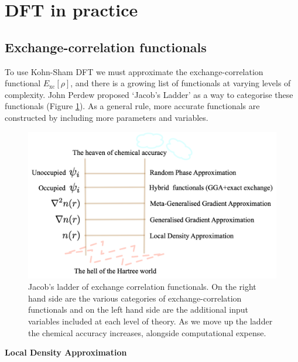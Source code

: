 \section{DFT in practice}

\subsection{Exchange-correlation functionals}
To use Kohn-Sham DFT we must approximate the exchange-correlation functional $E_{\textrm{xc}}\left[\rho\right]$, and there is a growing list of functionals at varying levels of complexity. John Perdew proposed `Jacob's Ladder' as a way to categorise these functionals (Figure \ref{jladder}). As a general rule, more accurate functionals are constructed by including more parameters and variables.

\begin{figure}[h]
\centering
  \includegraphics[width=0.8\columnwidth]{figures/ch3/jladder.png}
  \caption[Jacob's ladder of exchange-correlation functionals]{Jacob's ladder of exchange correlation functionals. On the right hand side are the various categories of exchange-correlation functionals and on the left hand side are the additional input variables included at each level of theory. As we move up the ladder the chemical accuracy increases, alongside computational expense.}
  \label{jladder}
\end{figure}


\textbf{Local Density Approximation} 


